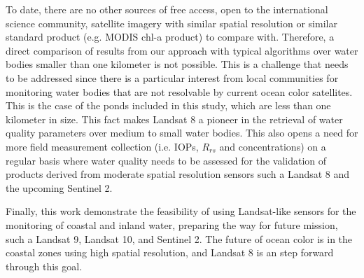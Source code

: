 To date, there are no other sources of free access, open to the international science community, satellite imagery with similar spatial resolution or similar standard product (e.g. MODIS chl-a product) to compare with. Therefore, a direct comparison of results from our approach with typical algorithms over water bodies smaller than one kilometer is not possible. This is a challenge that needs to be addressed since there is a particular interest from local communities for monitoring water bodies that are not resolvable by current ocean color satellites. This is the case of the ponds included in this study, which are less than one kilometer in size. This fact makes Landsat 8 a pioneer in the retrieval of water quality parameters over medium to small water bodies. This also opens a need for more field measurement collection (i.e. IOPs, $R_{rs}$ and concentrations) on a regular basis where water quality needs to be assessed for the validation of products derived from moderate spatial resolution sensors such a Landsat 8 and the upcoming Sentinel 2. 

Finally, this work demonstrate the feasibility of using Landsat-like sensors for the monitoring of coastal and inland water, preparing the way for future mission, such a Landsat 9, Landsat 10, and Sentinel 2. The future of ocean color is in the coastal zones using high spatial resolution, and Landsat 8 is an step forward through this goal.